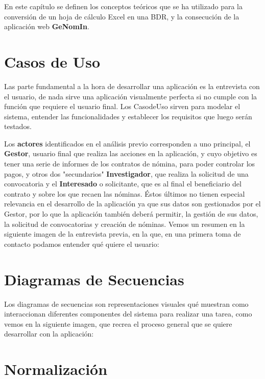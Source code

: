 
En este capítulo se definen los conceptos teóricos que se ha utilizado para la conversión de un hoja de cálculo Excel en una \acrfull{BDR}, y la consecución de la aplicación web \textbf{GeNomIn}.

\section{Casos de Uso}

Las parte fundamental a la hora de desarrollar una aplicación es la entrevista con el usuario, de nada sirve una aplicación visualmente perfecta si no cumple con la función que requiere el usuario final.
Los \gls{CasodeUso} sirven para modelar el sistema, entender las funcionalidades y establecer los requisitos que luego serán testados.

Los \textbf{actores} identificados en el análisis previo corresponden a uno principal, el \textbf{Gestor}, usuario final que realiza las acciones en la aplicación, y cuyo objetivo es tener una serie de informes de los contratos de nómina, para poder controlar los pagos, y otros dos "secundarios" \textbf{Investigador}, que realiza la solicitud de una convocatoria y el \textbf{Interesado} o solicitante, que es al final el beneficiario del contrato y sobre los que recaen las nóminas. Éstos últimos no tienen especial relevancia en el desarrollo de la aplicación ya que sus datos son gestionados por el Gestor, por lo que la aplicación también deberá permitir, la gestión de sus datos, la solicitud de convocatorias y creación de nóminas.
Vemos un resumen en la siguiente imagen de la entrevista previa, en la que, en una primera toma de contacto podamos entender qué quiere el usuario:

\section{Diagramas de Secuencias}
Los diagramas de secuencias son representaciones visuales qué muestran como interaccionan diferentes componentes del sistema para realizar una tarea, como vemos en la siguiente imagen, que recrea el proceso general que se quiere desarrollar con la aplicación:

\section{Normalización}

